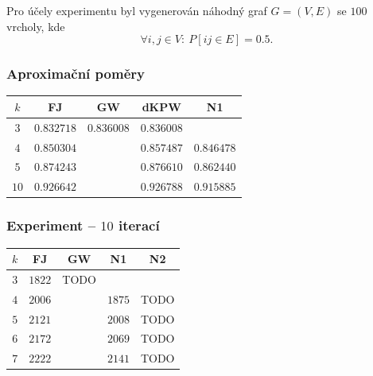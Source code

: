 Pro účely experimentu byl vygenerován náhodný graf $G=(V,E)$ se $100$ vrcholy, kde
$$
    \forall i,j \in V:\ P\left[ ij \in E \right] = 0.5.
$$

\subsubsection*{Aproximační poměry}
\begin{center}
    \begin{tabular}{ c c c c c }
    $k$  & FJ         & GW                  & dKPW                & N1         \\
    \hline
    $3$  & $0.832718$ & $\mathbf{0.836008}$ & $\mathbf{0.836008}$ &            \\  
    $4$  & $0.850304$ &                     & $\mathbf{0.857487}$ & $0.846478$ \\
    $5$  & $0.874243$ &                     & $\mathbf{0.876610}$ & $0.862440$ \\
    $10$ & $0.926642$ &                     & $\mathbf{0.926788}$ & $0.915885$ \\
    \end{tabular}
\end{center}

\subsubsection*{Experiment -- $10$ iterací}
\begin{center}
    \begin{tabular}{ c c c c c }
    $k$ & FJ         & GW                  & N1                  & N2         \\
    \hline
    $3$ & $1822$     & TODO                &                     &            \\  
    $4$ & $2006$     &                     & $1875$              & TODO       \\
    $5$ & $2121$     &                     & $2008$              & TODO       \\
    $6$ & $2172$     &                     & $2069$              & TODO       \\
    $7$ & $2222$     &                     & $2141$              & TODO       \\
    \end{tabular}
\end{center}

